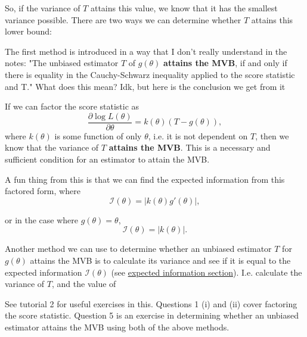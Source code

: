 So, if the variance of \(T\) attains this value, we know that it has the smallest variance possible. 
There are two ways we can determine whether \(T\) attains this lower bound:

\bigskip

The first method is introduced in a way that I don't really understand in the notes:
"The unbiased estimator \(T\) of \(g(\theta)\) \textbf{attains the MVB}, if and only if there is equality in the 
Cauchy-Schwarz inequality applied to the score statistic and T."
What does this mean? Idk, but here is the conclusion we get from it

\begin{theorem}\label{thm:factoring score stat}
    If we can factor the score statistic as 
    \begin{equation}\label{eq:factoring score statistic}
        \frac{\partial \log L(\theta)}{\partial \theta} = k(\theta)(T-g(\theta)),
    \end{equation}
    where \(k(\theta)\) is some function of only \(\theta\), i.e. it is not dependent on \(T\), then we know that the variance of \(T\) \textbf{attains the MVB}.
    This is a necessary and sufficient condition for an estimator to attain the MVB. 
\end{theorem}

A fun thing from this is that we can find the expected information from this factored form, where 
\begin{equation}\label{eq:expected info from factored score stat function theta}
    \mathscr{I}(\theta) = |k(\theta)g'(\theta)|,
\end{equation}

or in the case where \(g(\theta)=\theta\), 
\begin{equation}\label{eq:expected info from factored score stat scalar theta}
    \mathscr{I}(\theta) = |k(\theta)|.
\end{equation}


\bigskip

Another method we can use to determine whether an unbiased estimator \(T\) for \(g(\theta)\) attains the MVB is to calculate its variance and see if it is equal to the expected information \(\mathscr{I}(\theta)\) (see \hyperref[defn:expected information - single]{expected information section}). 
I.e. calculate the variance of \(T\), and the value of 

\begin{exercise}
    See tutorial 2 for useful exercises in this. Questions 1 (i) and (ii) cover factoring the score statistic. 
    Question 5 is an exercise in determining whether an unbiased estimator attains the MVB using both of the above methods.  
\end{exercise}





